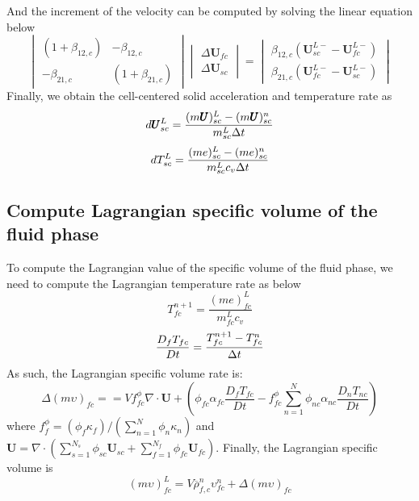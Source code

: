 \documentclass[preprint,12pt]{elsarticle}
\begin{document}
%
%
And the increment of the velocity can be computed by solving the linear equation below
%
\[ \begin{vmatrix} (1 + \beta_{12,c})  &  -\beta_{12,c} \\
                  -\beta_{21,c}       &  (1 + \beta_{21,c})
    \end{vmatrix}
    \begin{vmatrix} \Delta \pmb{U}_{fc} \\
                    \Delta \pmb{U}_{sc}
    \end{vmatrix}
    =
    \begin{vmatrix}  \beta_{12,c}(\pmb{U}_{sc}^{L-} - \pmb{U}_{fc}^{L-}) \\
                    \beta_{21,c}(\pmb{U}_{fc}^{L-} - \pmb{U}_{sc}^{L-})
    \end{vmatrix}                
\]
%
Finally, we obtain the cell-centered solid  acceleration and temperature rate as
%
%
\begin{equation}
 d\pmb{U}_{sc}^L = \frac{(m \pmb{U})_{sc}^L - (m \pmb{U})_{sc}^n}{m_{sc}^L \Delta{t}}
\end{equation}
%
\begin{equation}
 dT_{sc}^L = \frac{(me)_{sc}^L - (me)_{sc}^n}{m_{sc}^L c_v \Delta{t}}
\end{equation}
%
%
\subsection{\textsf{Compute Lagrangian specific volume of the fluid phase}}
To compute the Lagrangian value of the specific volume of the fluid phase, we need to compute the Lagrangian temperature rate as below
%
%
\begin{equation}
 T_{fc}^{n+1} = \frac{(me)_{fc}^L}{m_{fc}^L c_v}
\end{equation}
%
%
\begin{equation}
 \frac{D_f T_{fc}}{Dt} =  \frac{T_{fc}^{n+1} - T_{fc}^{n}}{\Delta{t}}
\end{equation}
%
%
As such, the Lagrangian specific volume rate is:
%
%
\begin{equation}
 \Delta (m \upsilon)_{fc} == V f_{fc}^{\phi} \nabla \cdot \pmb{U} + (\phi_{fc} \alpha_{fc} \frac{D_f T_{fc}}{Dt} - f_{fc}^{\phi} \sum_{n=1}^{N} \phi_{nc} \alpha_{nc} \frac{D_n T_{nc}}{Dt})
\end{equation}
%
%
where $ f_f^{\phi} = (\phi_f  \kappa_f ) / (\sum_{n=1}^{N} \phi_n \kappa_n)$ and  $\pmb{U} = \nabla \cdot (\sum_{s=1}^{N_s} \phi_{sc} \pmb{U}_{sc} + \sum_{f=1}^{N_f}  \phi_{fc} \pmb{U}_{fc})$.
%
%
Finally, the Lagrangian specific volume is
\begin{equation}
 (m \upsilon)_{fc}^L = V \overline{\rho}_{f,c}^n \upsilon_{fc}^n + \Delta (m\upsilon)_{fc} 
\end{equation}
%
%
\end{document}
